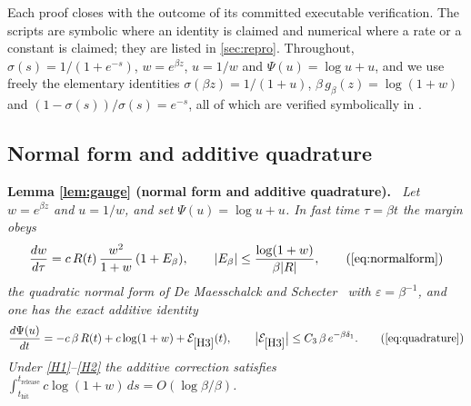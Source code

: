 \documentclass[11pt]{article}
\theoremstyle{definition}
\theoremstyle{remark}
\newcommand{\thit}{t_{\mathrm{hit}}}
\newcommand{\trel}{t_{\mathrm{release}}}
\newenvironment{lemmarep}[2]{%
  \par\medskip\noindent\textbf{Lemma \ref{#1} (#2).}\itshape\ \ignorespaces}%
  {\par\medskip}
\begin{document}
Each proof closes with the outcome of its committed executable verification. The
scripts are symbolic where an identity is claimed and numerical where a rate or a
constant is claimed; they are listed in \cref{sec:repro}. Throughout,
$\sigma(s)=1/(1+e^{-s})$, $w=e^{\beta z}$, $u=1/w$ and $\Psi(u)=\log u+u$, and we
use freely the elementary identities $\sigma(\beta z)=1/(1+u)$,
$\beta\,g_\beta(z)=\log(1+w)$ and $(1-\sigma(s))/\sigma(s)=e^{-s}$, all of which
are verified symbolically in .

\subsection{Normal form and additive quadrature}\label{app:L1}

\begin{lemmarep}{lem:gauge}{normal form and additive quadrature}
Let $w=e^{\beta z}$ and $u=1/w$, and set $\Psi(u)=\log u+u$. In fast time
$\tau=\beta t$ the margin obeys
\begin{equation*}
\frac{dw}{d\tau}=c\,R(t)\,\frac{w^{2}}{1+w}\,(1+E_\beta),
\qquad
|E_\beta|\le\frac{\log(1+w)}{\beta|R|},
\tag{\ref{eq:normalform}}
\end{equation*}
the quadratic normal form of De Maesschalck and
Schecter~\cite[equations~(1.9)--(1.10)]{DMS16} with $\varepsilon=\beta^{-1}$,
and one has the exact additive
identity
\begin{equation*}
\frac{d\Psi(u)}{dt}=-c\,\beta\,R(t)+c\log(1+w)+\mathcal{E}_{\eqref{H3}}(t),
\qquad
\bigl|\mathcal{E}_{\eqref{H3}}\bigr|\le C_3\,\beta\,e^{-\beta\delta_1}.
\tag{\ref{eq:quadrature}}
\end{equation*}
Under \eqref{H1}--\eqref{H2} the additive correction satisfies
$\int_{\thit}^{\trel}c\log(1+w)\,ds=O(\log\beta/\beta)$.
\end{lemmarep}
\end{document}
